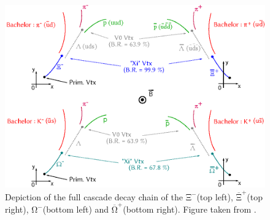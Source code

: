 \documentclass[ALICE,manyauthors]{cernphprep}
\newcommand{\rmXiM}     {\mbox{$\mathrm{\Xi}^{-}$}\xspace}
\newcommand{\rmAxiP}    {\mbox{$\mathrm {\overline{\Xi}^{+}}$}\xspace}
\newcommand{\rmOmegaM}  {\mbox{$\mathrm {\Omega^{-}}$}\space}
\newcommand{\rmAomegaP} {\mbox{$\mathrm {\overline{\Omega}^{+}}$}\xspace}
\begin{document}
\begin{figure}[t]
	\centering
	\includegraphics[width=1\textwidth]{Figs/Chapter4/Schema-4TypesDeCascade.eps}
	\caption{Depiction of the full cascade decay chain of the \rmXiM (top left), \rmAxiP (top right), \rmOmegaM (bottom left) and \rmAomegaP (bottom right). Figure taken from \cite{maireFourTypesCascade2011}.}
	\label{fig:CascadeDecay}
\end{figure}
\end{document}
